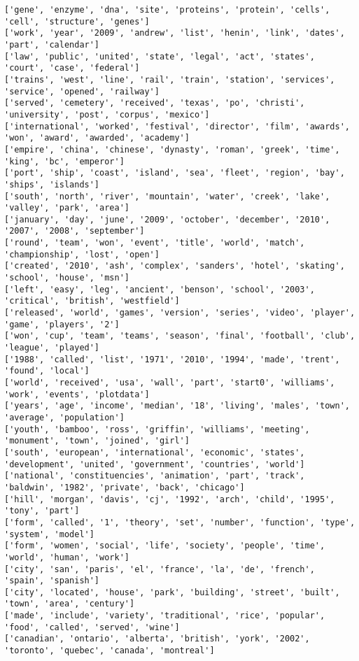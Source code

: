 \documentclass[11pt]{ctexart}
\begin{document}
\begin{Verbatim}[commandchars=\\\{\}]
['gene', 'enzyme', 'dna', 'site', 'proteins', 'protein', 'cells', 'cell', 'structure', 'genes']
['work', 'year', '2009', 'andrew', 'list', 'henin', 'link', 'dates', 'part', 'calendar']
['law', 'public', 'united', 'state', 'legal', 'act', 'states', 'court', 'case', 'federal']
['trains', 'west', 'line', 'rail', 'train', 'station', 'services', 'service', 'opened', 'railway']
['served', 'cemetery', 'received', 'texas', 'po', 'christi', 'university', 'post', 'corpus', 'mexico']
['international', 'worked', 'festival', 'director', 'film', 'awards', 'won', 'award', 'awarded', 'academy']
['empire', 'china', 'chinese', 'dynasty', 'roman', 'greek', 'time', 'king', 'bc', 'emperor']
['port', 'ship', 'coast', 'island', 'sea', 'fleet', 'region', 'bay', 'ships', 'islands']
['south', 'north', 'river', 'mountain', 'water', 'creek', 'lake', 'valley', 'park', 'area']
['january', 'day', 'june', '2009', 'october', 'december', '2010', '2007', '2008', 'september']
['round', 'team', 'won', 'event', 'title', 'world', 'match', 'championship', 'lost', 'open']
['created', '2010', 'ash', 'complex', 'sanders', 'hotel', 'skating', 'school', 'house', 'msn']
['left', 'easy', 'leg', 'ancient', 'benson', 'school', '2003', 'critical', 'british', 'westfield']
['released', 'world', 'games', 'version', 'series', 'video', 'player', 'game', 'players', '2']
['won', 'cup', 'team', 'teams', 'season', 'final', 'football', 'club', 'league', 'played']
['1988', 'called', 'list', '1971', '2010', '1994', 'made', 'trent', 'found', 'local']
['world', 'received', 'usa', 'wall', 'part', 'start0', 'williams', 'work', 'events', 'plotdata']
['years', 'age', 'income', 'median', '18', 'living', 'males', 'town', 'average', 'population']
['youth', 'bamboo', 'ross', 'griffin', 'williams', 'meeting', 'monument', 'town', 'joined', 'girl']
['south', 'european', 'international', 'economic', 'states', 'development', 'united', 'government', 'countries', 'world']
['national', 'constituencies', 'animation', 'part', 'track', 'baldwin', '1982', 'private', 'back', 'chicago']
['hill', 'morgan', 'davis', 'cj', '1992', 'arch', 'child', '1995', 'tony', 'part']
['form', 'called', '1', 'theory', 'set', 'number', 'function', 'type', 'system', 'model']
['form', 'women', 'social', 'life', 'society', 'people', 'time', 'world', 'human', 'work']
['city', 'san', 'paris', 'el', 'france', 'la', 'de', 'french', 'spain', 'spanish']
['city', 'located', 'house', 'park', 'building', 'street', 'built', 'town', 'area', 'century']
['made', 'include', 'variety', 'traditional', 'rice', 'popular', 'food', 'called', 'served', 'wine']
['canadian', 'ontario', 'alberta', 'british', 'york', '2002', 'toronto', 'quebec', 'canada', 'montreal']

\end{Verbatim}
\end{document}
